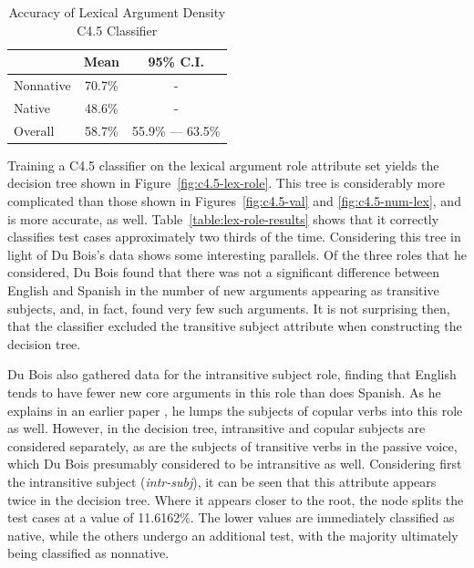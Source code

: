 \documentclass[main.tex]{subfiles}
\begin{document}
\FloatBarrier
\begin{table}[ht]
\centering
\caption{Accuracy of Lexical Argument Density C4.5 Classifier}
\begin{tabular}{l c c}
\toprule
& Mean & 95\% C.I.\\
\midrule
Nonnative & 70.7\% & - \\
[6pt]Native & 48.6\% & - \\
[6pt]Overall & 58.7\% & 55.9\% --- 63.5\% \\
\bottomrule
\end{tabular}
\label{table:num-lex-results}
\end{table}

Training a C4.5 classifier on the lexical argument role attribute set yields the decision tree shown in Figure~\ref{fig:c4.5-lex-role}. This tree is considerably more complicated than those shown in Figures~\ref{fig:c4.5-val} and \ref{fig:c4.5-num-lex}, and is more accurate, as well. Table~\ref{table:lex-role-results} shows that it correctly classifies test cases approximately two thirds of the time. Considering this tree in light of Du Bois's data shows some interesting parallels. Of the three roles that he considered, Du Bois found that there was not a significant difference between English and Spanish in the number of new arguments appearing as transitive subjects, and, in fact, found very few such arguments. It is not surprising then, that the classifier excluded the transitive subject attribute when constructing the decision tree.

Du Bois also gathered data for the intransitive subject role, finding that English tends to have fewer new core arguments in this role than does Spanish. As he explains in an earlier paper \citep{dubois:1987}, he lumps the subjects of copular verbs into this role as well. However, in the decision tree, intransitive and copular subjects are considered separately, as are the subjects of transitive verbs in the passive voice, which Du Bois presumably considered to be intransitive as well. Considering first the intransitive subject (\textit{intr-subj}), it can be seen that this attribute appears twice in the decision tree. Where it appears closer to the root, the node splits the test cases at a value of 11.6162\%. The lower values are immediately classified as native, while the others undergo an additional test, with the majority ultimately being classified as nonnative.
\end{document}
